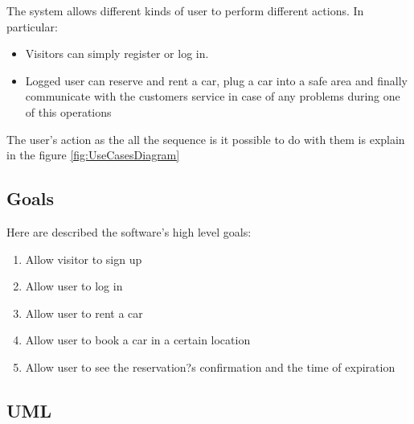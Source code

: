 The system allows different kinds of user to perform different actions. In particular:
\begin{itemize}
	\item Visitors can simply register or log in.
	\item Logged user can reserve and rent a car, plug a car into a safe area and finally communicate with the customers service in case of any problems during one of this operations
\end{itemize}
The user's action as the all the sequence is it possible to do with them is explain in the figure \ref{fig:UseCasesDiagram}

\subsection{Goals}
Here are described the software's high level goals:
\begin{enumerate}[label=\subscript{G}{\arabic*}]
	\item Allow visitor to sign up
	\item Allow user to log in
	\item Allow user to rent a car
	\item Allow user to book a car in a certain location
	\item Allow user to see the reservation?s confirmation and the time of expiration
\end{enumerate}

\subsection{UML}	
